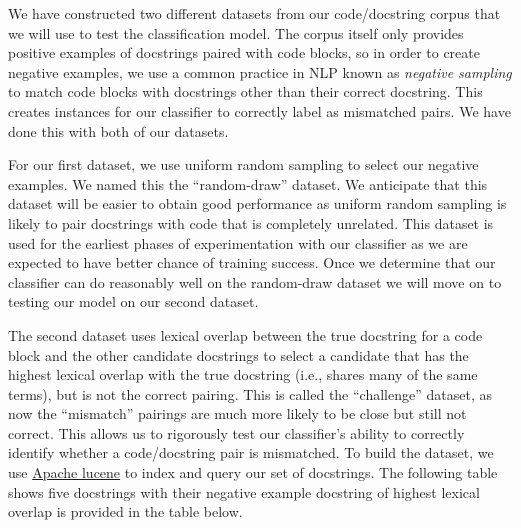 \documentclass[article, 12pt, oneside]{memoir}
\begin{document}
We have constructed two different datasets from our code/docstring
corpus that we will use to test the classification model. The corpus
itself only provides positive examples of docstrings paired with code
blocks, so in order to create negative examples, we use a common
practice in NLP known as \emph{negative sampling} to match code blocks
with docstrings other than their correct docstring. This creates
instances for our classifier to correctly label as mismatched pairs. We
have done this with both of our datasets.

For our first dataset, we use uniform random sampling to select our
negative examples. We named this the ``random-draw'' dataset. We
anticipate that this dataset will be easier to obtain good performance
as uniform random sampling is likely to pair docstrings with code that
is completely unrelated. This dataset is used for the earliest phases of
experimentation with our classifier as we are expected to have better
chance of training success. Once we determine that our classifier can do
reasonably well on the random-draw dataset we will move on to testing
our model on our second dataset.

The second dataset uses lexical overlap between the true docstring for a
code block and the other candidate docstrings to select a candidate that
has the highest lexical overlap with the true docstring (i.e., shares
many of the same terms), but is not the correct pairing. This is called
the ``challenge'' dataset, as now the ``mismatch'' pairings are much
more likely to be close but still not correct. This allows us to
rigorously test our classifier's ability to correctly identify whether a
code/docstring pair is mismatched. To build the dataset, we use
\href{http://lucene.apache.org/}{Apache lucene} to index and query our
set of docstrings. The following table shows five docstrings with their
negative example docstring of highest lexical overlap is provided in the
table below.
\end{document}
